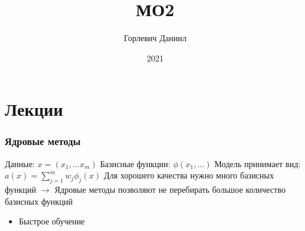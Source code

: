 \documentclass[a4paper, 12pt]{article}
\author{Горлевич Даниил}
\title{МО2}
\date{2021}
\begin{document}
\maketitle

\part{Лекции}

\section{Ядровые методы}

Данные: $x = (x_{1}, ... x_{m})$
\newline
Базисные функции: $\phi(x_{1}, ...)$
\newline
Модель принимает вид: $a(x) = \sum_{j = 1}^{m}w_{j}\phi_{j}(x)$
\newline
Для хорошего качества нужно много базисных функций $\rightarrow$ Ядровые методы позволяют не перебирать большое количество базисных функций

\begin{itemize}
    \item Быстрое обучение
\end{itemize}
\end{document}
